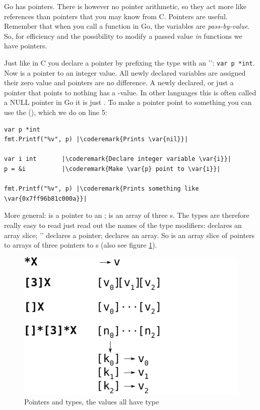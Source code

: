 \noindent{}
Go has pointers.
There is however no pointer arithmetic, so they act more like
references than pointers that you may know from C. Pointers 
are useful.
Remember that when you call a function in Go, the variables are
\emph{pass-by-value}. So, for efficiency and the possibility to modify a
passed value \emph{in} functions we have pointers.

Just like in C you declare a pointer by prefixing the type with an
'\key{*}':
\lstinline{var p *int}. Now  is a pointer to an integer value.
All newly declared variables are assigned their zero value and pointers
are no difference. A newly declared, or just a pointer that points to
nothing has a -value. In other languages this is often called
a NULL pointer in Go it is just . To make 
a pointer point to something you can use the 
(\func{\&}), which we do on line 5:
\begin{lstlisting}[caption=Make use of a pointer,numbers=right,label=src:pointers]
var p *int
fmt.Printf("%v", p) |\coderemark{Prints \var{nil}}|

var i int	    |\coderemark{Declare integer variable \var{i}}|
p = &i		    |\coderemark{Make \var{p} point to \var{i}}|

fmt.Printf("%v", p) |\coderemark{Prints something like \var{0x7ff96b81c000a}}|
\end{lstlisting}

More general:  is a pointer to an ;  is an
array of three s. The
types are therefore really easy to read just read out the names of the
type modifiers: \type{[]} declares an array slice;
'\key{*}'
declares a pointer; \type{[size]} declares an array. So
 is an array slice of pointers to arrays of three
pointers to s (also see figure \ref{fig:pointers}).
\begin{figure}[h]
\caption[Pointers and types]{Pointers and types, the values  all have type }
\label{fig:pointers}
\begin{center}
\includegraphics[scale=0.65]{fig/pointers.pdf}
\end{center}
\end{figure}

